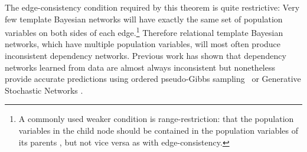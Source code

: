 \documentclass[runningheads,a4paper]{llncs}
\begin{document}

%

The edge-consistency condition required by this theorem is quite restrictive: Very few template Bayesian networks will have exactly the same set of population variables on both sides of each edge.\footnote{A commonly used weaker condition is range-restriction: that the population variables in the child node should be contained in the population variables of its parents \cite{Kersting2007}, but not vice versa as with edge-consistency.}
%
%
Therefore relational template Bayesian networks, which have multiple population variables, will most often produce inconsistent dependency networks. Previous work has shown that dependency networks learned from data are almost always inconsistent but nonetheless provide accurate predictions using ordered pseudo-Gibbs sampling~\cite{Heckerman2000,Neville2007,Lowd2012} or Generative Stochastic Networks \cite[Sec.3.4]{Bengio2014}.

\end{document}

